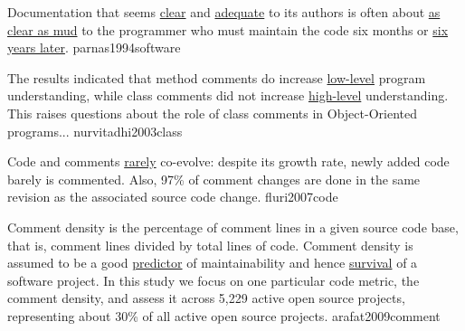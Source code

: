 \documentclass{article}
\begin{document}
  {Documentation that seems \ul{clear} and \ul{adequate} to its authors is often about \ul{as clear as mud} to the programmer who must maintain the code six months or \ul{six years later}.}
  {parnas1994software}


  {The results indicated that method comments do increase \ul{low-level} program understanding, while class comments did not increase \ul{high-level} understanding. This raises questions about the role of class comments in Object-Oriented programs...}
  {nurvitadhi2003class}

  {Code and comments \ul{rarely} co-evolve: despite its growth rate, newly added code barely is commented. Also, 97\% of comment changes are done in the same revision as the associated source code change.}
  {fluri2007code}

  {Comment density is the percentage of comment lines in a given source code base, that is, comment lines divided by total lines of code. Comment density is assumed to be a good \ul{predictor} of maintainability and hence \ul{survival} of a software project. In this study we focus on one particular code metric, the comment density, and assess it across 5,229 active open source projects, representing about 30\% of all active open source projects.}
  {arafat2009comment}

\end{document}
